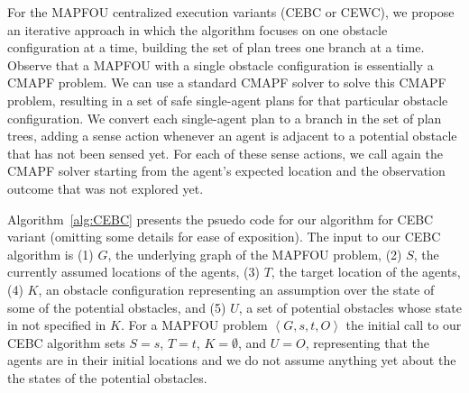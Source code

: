 \documentclass[letterpaper]{article} %
\newcommand{\tuple}[1]{\ensuremath{\left \langle #1 \right \rangle }}
\begin{document}
For the MAPFOU centralized execution variants (CEBC or CEWC), we propose an iterative approach in which the algorithm focuses on one obstacle configuration at a time, building the set of plan trees one branch at a time. 
Observe that a MAPFOU with a single obstacle configuration is essentially a CMAPF problem. 
We can use a standard CMAPF solver to solve this CMAPF problem, resulting in a set of safe single-agent plans for that particular obstacle configuration. 
We convert each single-agent plan to a branch in the set of plan trees, 
adding a sense action whenever an agent is adjacent to a potential obstacle that has not been sensed yet. 
For each of these sense actions, we call again the CMAPF solver starting from the agent's expected location and the observation outcome that was not explored yet. 

Algorithm~\ref{alg:CEBC} presents the psuedo code for our algorithm for CEBC variant (omitting some details for ease of exposition). 
The input to our CEBC algorithm is 
(1) $G$, the underlying graph of the MAPFOU problem, 
(2) $S$, the currently assumed locations of the agents, 
(3) $T$, the target location of the agents, 
(4) $K$, an obstacle configuration representing an assumption over the state of some of the potential obstacles, 
and (5) $U$, a set of potential obstacles whose state in not specified in $K$. 
For a MAPFOU problem $\tuple{G,s,t,O}$ the initial call to our CEBC algorithm sets 
$S=s$, $T=t$, $K=\emptyset$, and $U=O$, representing that the agents are in their initial locations and we do not assume anything yet about the the states of the potential obstacles. 
\end{document}
